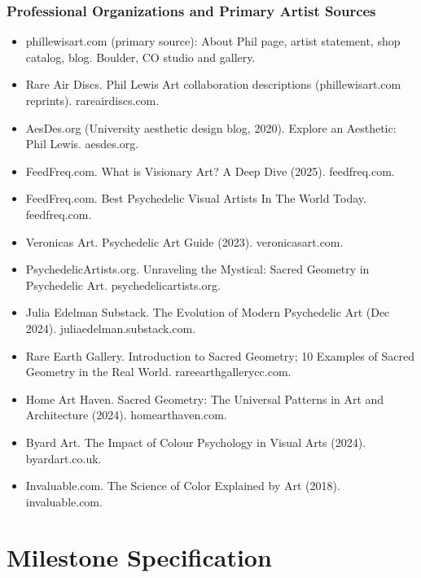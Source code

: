\documentclass[11pt,letterpaper]{article}
\newcommand{\stageheader}[2]{%
  \noindent\colorbox{#2}{\makebox[\textwidth][l]{%
    \textcolor{white}{\bfseries\sffamily\hspace{6pt}#1\hspace{6pt}}}}%
  \vspace{0.5em}\par%
}
\begin{document}
\subsubsection{Professional Organizations and Primary Artist Sources}

\begin{itemize}[noitemsep]
  \item phillewisart.com (primary source): About Phil page, artist statement, shop catalog, blog. Boulder, CO studio and gallery.
  \item Rare Air Discs. Phil Lewis Art collaboration descriptions (phillewisart.com reprints). rareairdiscs.com.
  \item AesDes.org (University aesthetic design blog, 2020). Explore an Aesthetic: Phil Lewis. aesdes.org.
  \item FeedFreq.com. What is Visionary Art? A Deep Dive (2025). feedfreq.com.
  \item FeedFreq.com. Best Psychedelic Visual Artists In The World Today. feedfreq.com.
  \item Veronicas Art. Psychedelic Art Guide (2023). veronicasart.com.
  \item PsychedelicArtists.org. Unraveling the Mystical: Sacred Geometry in Psychedelic Art. psychedelicartists.org.
  \item Julia Edelman Substack. The Evolution of Modern Psychedelic Art (Dec 2024). juliaedelman.substack.com.
  \item Rare Earth Gallery. Introduction to Sacred Geometry; 10 Examples of Sacred Geometry in the Real World. rareearthgallerycc.com.
  \item Home Art Haven. Sacred Geometry: The Universal Patterns in Art and Architecture (2024). homearthaven.com.
  \item Byard Art. The Impact of Colour Psychology in Visual Arts (2024). byardart.co.uk.
  \item Invaluable.com. The Science of Color Explained by Art (2018). invaluable.com.
\end{itemize}

\newpage

\stageheader{STAGE 3 --- MISSION PACKAGE}{tertiary}

\section{Milestone Specification}
\end{document}
